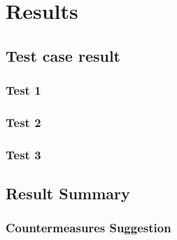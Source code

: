 \chapter*{Results}

\section{Test case result}

\subsection{Test 1}

\subsection{Test 2}

\subsection{Test 3}

\section{Result Summary}

\subsection{Countermeasures Suggestion}

